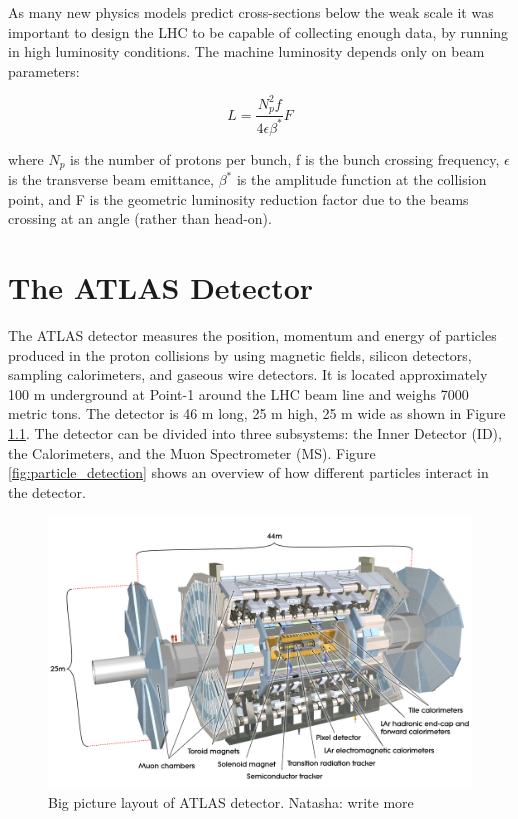 As many new physics models predict cross-sections below the weak scale it was important to design the LHC to be capable of collecting enough data, by running in high luminosity conditions. The machine luminosity depends only on beam parameters:

\begin{equation}
L=\frac{N_{p}^{2}f}{4\epsilon\beta^{*}}F
\end{equation}

where $N_{p}$ is the number of protons per bunch, f is the bunch crossing frequency, $\epsilon$ is the transverse beam emittance, $\beta^{*}$ is the amplitude function at the collision point, and F is the geometric luminosity reduction factor due to the beams crossing at an angle (rather than head-on). 

\chapter{The ATLAS Detector}
The ATLAS detector measures the position, momentum and energy of particles produced in the proton collisions by using magnetic fields, silicon detectors, sampling calorimeters, and gaseous wire detectors. It is located approximately 100 m underground at Point-1 around the LHC beam line and weighs 7000 metric tons. The detector is 46 m long, 25 m high, 25 m wide  as shown in Figure \ref{fig:atlas_detectors}. The detector can be divided into three subsystems: the Inner Detector (ID), the Calorimeters, and the Muon Spectrometer (MS). Figure \ref{fig:particle_detection} shows an overview of how different particles interact in the detector.
\begin{figure}[h!]
  \centering
  \includegraphics[width=\hsize]{figures/Detector/atlas.jpg}
  \caption{Big picture layout of ATLAS detector. Natasha: write more} 
  \label{fig:atlas_detectors}
\end{figure}
\FloatBarrier

